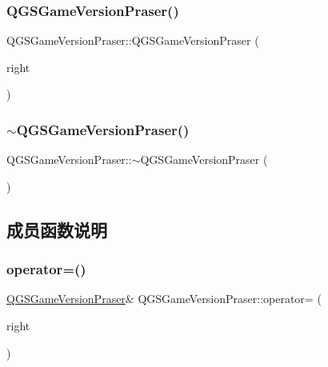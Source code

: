 \subsubsection{\texorpdfstring{Q\+G\+S\+Game\+Version\+Praser()}{QGSGameVersionPraser()}\hspace{0.1cm}{\footnotesize\ttfamily [3/3]}}
{\footnotesize\ttfamily Q\+G\+S\+Game\+Version\+Praser\+::\+Q\+G\+S\+Game\+Version\+Praser (\begin{DoxyParamCaption}\item[{\mbox{\hyperlink{class_q_g_s_game_version_praser}{Q\+G\+S\+Game\+Version\+Praser}} \&\&}]{right }\end{DoxyParamCaption})\hspace{0.3cm}{\ttfamily [delete]}}

\mbox{\label{class_q_g_s_game_version_praser_a1764586e9244b9b29ba7335839c283e0}} 
\subsubsection{\texorpdfstring{$\sim$\+Q\+G\+S\+Game\+Version\+Praser()}{~QGSGameVersionPraser()}}
{\footnotesize\ttfamily Q\+G\+S\+Game\+Version\+Praser\+::$\sim$\+Q\+G\+S\+Game\+Version\+Praser (\begin{DoxyParamCaption}{ }\end{DoxyParamCaption})\hspace{0.3cm}{\ttfamily [virtual]}}



\subsection{成员函数说明}
\mbox{\label{class_q_g_s_game_version_praser_af63cf8dc5e5c84896ea29727448b0206}} 
\subsubsection{\texorpdfstring{operator=()}{operator=()}\hspace{0.1cm}{\footnotesize\ttfamily [1/2]}}
{\footnotesize\ttfamily \mbox{\hyperlink{class_q_g_s_game_version_praser}{Q\+G\+S\+Game\+Version\+Praser}}\& Q\+G\+S\+Game\+Version\+Praser\+::operator= (\begin{DoxyParamCaption}\item[{const \mbox{\hyperlink{class_q_g_s_game_version_praser}{Q\+G\+S\+Game\+Version\+Praser}} \&}]{right }\end{DoxyParamCaption})\hspace{0.3cm}{\ttfamily [delete]}}

